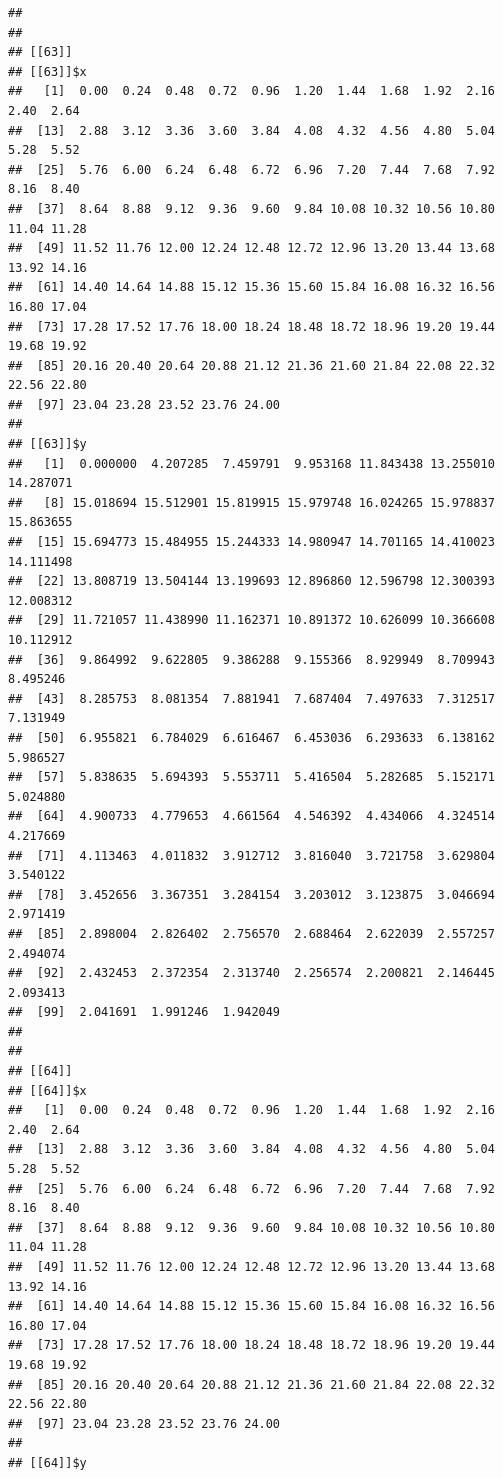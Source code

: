 \documentclass[
  ignorenonframetext,
]{beamer}
\begin{document}
\begin{frame}[fragile]{}
\begin{verbatim}
## 
## 
## [[63]]
## [[63]]$x
##   [1]  0.00  0.24  0.48  0.72  0.96  1.20  1.44  1.68  1.92  2.16  2.40  2.64
##  [13]  2.88  3.12  3.36  3.60  3.84  4.08  4.32  4.56  4.80  5.04  5.28  5.52
##  [25]  5.76  6.00  6.24  6.48  6.72  6.96  7.20  7.44  7.68  7.92  8.16  8.40
##  [37]  8.64  8.88  9.12  9.36  9.60  9.84 10.08 10.32 10.56 10.80 11.04 11.28
##  [49] 11.52 11.76 12.00 12.24 12.48 12.72 12.96 13.20 13.44 13.68 13.92 14.16
##  [61] 14.40 14.64 14.88 15.12 15.36 15.60 15.84 16.08 16.32 16.56 16.80 17.04
##  [73] 17.28 17.52 17.76 18.00 18.24 18.48 18.72 18.96 19.20 19.44 19.68 19.92
##  [85] 20.16 20.40 20.64 20.88 21.12 21.36 21.60 21.84 22.08 22.32 22.56 22.80
##  [97] 23.04 23.28 23.52 23.76 24.00
## 
## [[63]]$y
##   [1]  0.000000  4.207285  7.459791  9.953168 11.843438 13.255010 14.287071
##   [8] 15.018694 15.512901 15.819915 15.979748 16.024265 15.978837 15.863655
##  [15] 15.694773 15.484955 15.244333 14.980947 14.701165 14.410023 14.111498
##  [22] 13.808719 13.504144 13.199693 12.896860 12.596798 12.300393 12.008312
##  [29] 11.721057 11.438990 11.162371 10.891372 10.626099 10.366608 10.112912
##  [36]  9.864992  9.622805  9.386288  9.155366  8.929949  8.709943  8.495246
##  [43]  8.285753  8.081354  7.881941  7.687404  7.497633  7.312517  7.131949
##  [50]  6.955821  6.784029  6.616467  6.453036  6.293633  6.138162  5.986527
##  [57]  5.838635  5.694393  5.553711  5.416504  5.282685  5.152171  5.024880
##  [64]  4.900733  4.779653  4.661564  4.546392  4.434066  4.324514  4.217669
##  [71]  4.113463  4.011832  3.912712  3.816040  3.721758  3.629804  3.540122
##  [78]  3.452656  3.367351  3.284154  3.203012  3.123875  3.046694  2.971419
##  [85]  2.898004  2.826402  2.756570  2.688464  2.622039  2.557257  2.494074
##  [92]  2.432453  2.372354  2.313740  2.256574  2.200821  2.146445  2.093413
##  [99]  2.041691  1.991246  1.942049
## 
## 
## [[64]]
## [[64]]$x
##   [1]  0.00  0.24  0.48  0.72  0.96  1.20  1.44  1.68  1.92  2.16  2.40  2.64
##  [13]  2.88  3.12  3.36  3.60  3.84  4.08  4.32  4.56  4.80  5.04  5.28  5.52
##  [25]  5.76  6.00  6.24  6.48  6.72  6.96  7.20  7.44  7.68  7.92  8.16  8.40
##  [37]  8.64  8.88  9.12  9.36  9.60  9.84 10.08 10.32 10.56 10.80 11.04 11.28
##  [49] 11.52 11.76 12.00 12.24 12.48 12.72 12.96 13.20 13.44 13.68 13.92 14.16
##  [61] 14.40 14.64 14.88 15.12 15.36 15.60 15.84 16.08 16.32 16.56 16.80 17.04
##  [73] 17.28 17.52 17.76 18.00 18.24 18.48 18.72 18.96 19.20 19.44 19.68 19.92
##  [85] 20.16 20.40 20.64 20.88 21.12 21.36 21.60 21.84 22.08 22.32 22.56 22.80
##  [97] 23.04 23.28 23.52 23.76 24.00
## 
## [[64]]$y

\end{verbatim}
\end{frame}
\end{document}
